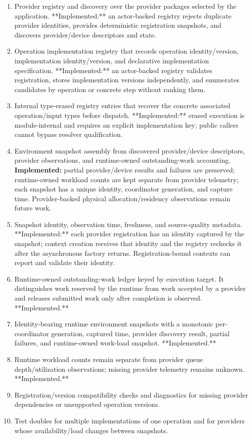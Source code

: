 \deliverables
\begin{enumerate}
  \item Provider registry and discovery over the provider packages selected by the application. **Implemented:** an actor-backed registry rejects duplicate provider identities, provides deterministic registration snapshots, and discovers provider/device descriptors and state.
  \item Operation implementation registry that records operation identity/version, implementation identity/version, and declarative implementation specification. **Implemented:** an actor-backed registry validates registration, stores implementation versions independently, and enumerates candidates by operation or concrete step without ranking them.
  \item Internal type-erased registry entries that recover the concrete associated operation/input types before dispatch. **Implemented:** erased execution is module-internal and requires an explicit implementation key; public callers cannot bypass resolver qualification.
  \item Environment snapshot assembly from discovered provider/device descriptors, provider observations, and runtime-owned outstanding-work accounting. \textbf{Implemented:} partial provider/device results and failures are preserved; runtime-owned workload counts are kept separate from provider telemetry; each snapshot has a unique identity, coordinator generation, and capture time. Provider-backed physical allocation/residency observations remain future work.
  \item Snapshot identity, observation time, freshness, and source-quality metadata. **Implemented:** each provider registration has an identity captured by the snapshot; context creation receives that identity and the registry rechecks it after the asynchronous factory returns. Registration-bound contexts can report and validate their identity.
  \item Runtime-owned outstanding-work ledger keyed by execution target. It distinguishes work reserved by the runtime from work accepted by a provider and releases submitted work only after completion is observed. **Implemented.**
  \item Identity-bearing runtime environment snapshots with a monotonic per-coordinator generation, captured time, provider discovery result, partial failures, and runtime-owned work-load snapshot. **Implemented.**
  \item Runtime workload counts remain separate from provider queue depth/utilization observations; missing provider telemetry remains unknown. **Implemented.**
  \item Registration/version compatibility checks and diagnostics for missing provider dependencies or unsupported operation versions.
  \item Test doubles for multiple implementations of one operation and for providers whose availability/load changes between snapshots.
\end{enumerate}

